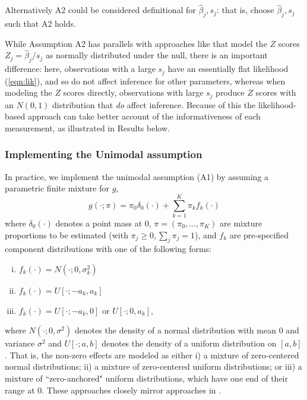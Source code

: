 \documentclass[11pt]{article}
\begin{document}
Alternatively A2 could be considered definitional for $\hat\beta_j,s_j$: that is, choose $\hat\beta_j,s_j$ such that A2 holds. 

While Assumption A2 has parallels with approaches like \cite{efron, cai?} that model the $Z$ scores $Z_j = \hat\beta_j/s_j$ as normally distributed under the null, 
there is an important difference: here, observations with a large $s_j$ have an essentially flat likelihood (\ref{eqn:lik}), and so do not affect inference for
other parameters, whereas when modeling the $Z$ scores directly, observations with large $s_j$ produce $Z$ scores with an $N(0,1)$ distribution that {\it do} affect inference. 
Because of this the likelihood-based approach can take better account of the informativeness of each measurement, as illustrated in Results below.


\subsubsection*{Implementing the Unimodal assumption}
 
In practice, we implement the unimodal assumption (A1) by assuming a parametric finite mixture for $g$, 
\begin{equation} \label{eqn:g}
g(\cdot; \pi) = \pi_0 \delta_0(\cdot) + \sum_{k=1}^K \pi_k f_k(\cdot) 
\end{equation}
where $\delta_0(\cdot)$ denotes a point mass at 0, $\pi=(\pi_0,\dots,\pi_K)$ are mixture proportions to be estimated (with $\pi_j \geq 0, \sum_j \pi_j=1$), and $f_k$ are pre-specified 
component distributions with one of the following forms: 
\begin{enumerate}[i)]
\item $f_k(\cdot) = N(\cdot; 0, \sigma^2_k)$
\item $f_k(\cdot) = U[\cdot; -a_k,a_k]$
\item $f_k(\cdot) = U[\cdot; -a_k,0] \text{ or } U[\cdot; 0,a_k]$,
\end{enumerate}
where $N(\cdot; 0,\sigma^2)$ denotes the density of a normal distribution with mean 0 and variance $\sigma^2$ and
$U[\cdot; a,b]$ denotes the density of a uniform distribution on $[a,b]$.
That is, the non-zero effects are modeled as either i) a mixture of zero-centered normal distributions; ii) a mixture of zero-centered uniform distributions;
or iii) a mixture of ``zero-anchored" uniform distributions, which have one end of their range at 0. These approaches closely mirror approaches in \cite{campy.thomas}.
 
\end{document}
